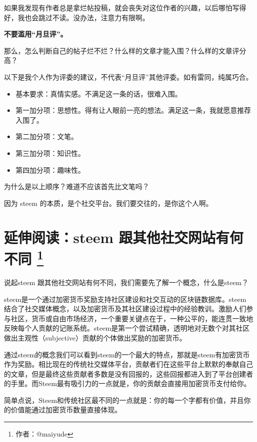 \documentclass[]{ctexbook}
\providecommand{\tightlist}{%
  \setlength{\itemsep}{0pt}\setlength{\parskip}{0pt}}
\begin{document}
如果我发现有作者总是拿烂帖投稿，就会丧失对这位作者的兴趣，以后哪怕写得好，我也会跳过不读。没办法，注意力有限啊。

\textbf{不要滥用``月旦评''。}

那么，怎么判断自己的帖子烂不烂？什么样的文章才能入围？什么样的文章评分高？

以下是我个人作为评委的建议，不代表``月旦评''其他评委。如有雷同，纯属巧合。

\begin{itemize}
\tightlist
\item
  基本要求：真情实感。不满足这一条的话，很难入围。
\item
  第一加分项：思想性。得有让人眼前一亮的想法。满足这一条，我就愿意推荐入围了。
\item
  第二加分项：文笔。
\item
  第三加分项：知识性。
\item
  第四加分项：趣味性。
\end{itemize}

为什么是以上顺序？难道不应该首先比文笔吗？

因为 steem 的本质，是个社交平台。我们要交往的，是你这个人啊。

\hypertarget{comparison-social}{%
\section[延伸阅读：steem 跟其他社交网站有何不同 ]{\texorpdfstring{延伸阅读：steem 跟其他社交网站有何不同 \footnote{作者：@maiyude}}{延伸阅读：steem 跟其他社交网站有何不同 }}\label{comparison-social}}

说起steem 跟其他社交网站有何不同，我们需要先了解一个概念，什么是steem？

steem是一个通过加密货币奖励支持社区建设和社交互动的区块链数据库。steem结合了社交媒体概念，以及加密货币及其社区建设过程中的经验教训。激励人们参与社区，货币或自由市场经济，一个重要关键点在于，一种公平的，能连贯一致地反映每个人贡献的记账系统。steem是第一个尝试精确，透明地对无数个对其社区做出主观性（subjective）贡献的个体做出奖励的加密货币。

通过steem的概念我们可以看到steem的一个最大的特点，那就是steem有加密货币作为奖励。相比现在的传统社交媒体平台，贡献者们在这些平台上默默的奉献自己的文章，但是最终这些贡献者多数是没有回报的，这些回报都进入到了平台创建者的手里。而Steem最有吸引力的一点就是，你的贡献会直接用加密货币支付给你。

简单点说，Steem和传统社区最不同的一点就是：你的每一个字都有价值，并且你的价值能通过加密货币数量直接体现。
\end{document}
